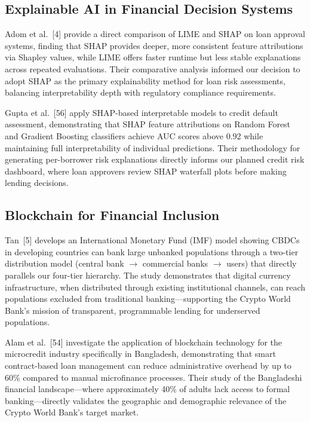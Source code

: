 \documentclass[12pt,a4paper]{report}
\begin{document}
\subsection{Explainable AI in Financial Decision Systems}

Adom et al.~[4] provide a direct comparison of LIME and SHAP on loan approval systems, finding that SHAP provides deeper, more consistent feature attributions via Shapley values, while LIME offers faster runtime but less stable explanations across repeated evaluations. Their comparative analysis informed our decision to adopt SHAP as the primary explainability method for loan risk assessments, balancing interpretability depth with regulatory compliance requirements.

Gupta et al.~[56] apply SHAP-based interpretable models to credit default assessment, demonstrating that SHAP feature attributions on Random Forest and Gradient Boosting classifiers achieve AUC scores above 0.92 while maintaining full interpretability of individual predictions. Their methodology for generating per-borrower risk explanations directly informs our planned credit risk dashboard, where loan approvers review SHAP waterfall plots before making lending decisions.

\subsection{Blockchain for Financial Inclusion}

Tan~[5] develops an International Monetary Fund (IMF) model showing CBDCs in developing countries can bank large unbanked populations through a two-tier distribution model (central bank $\to$ commercial banks $\to$ users) that directly parallels our four-tier hierarchy. The study demonstrates that digital currency infrastructure, when distributed through existing institutional channels, can reach populations excluded from traditional banking---supporting the Crypto World Bank's mission of transparent, programmable lending for underserved populations.

Alam et al.~[54] investigate the application of blockchain technology for the microcredit industry specifically in Bangladesh, demonstrating that smart contract-based loan management can reduce administrative overhead by up to 60\% compared to manual microfinance processes. Their study of the Bangladeshi financial landscape---where approximately 40\% of adults lack access to formal banking---directly validates the geographic and demographic relevance of the Crypto World Bank's target market.
\end{document}
